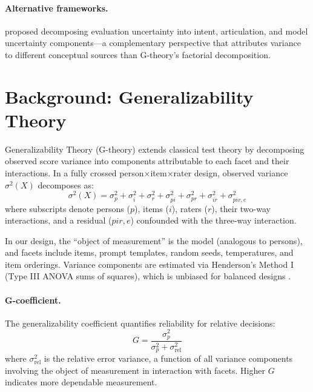 \documentclass[11pt]{article}
\begin{document}
\paragraph{Alternative frameworks.}
\citet{kunievsky2025} proposed decomposing evaluation uncertainty into intent, articulation, and model uncertainty components---a complementary perspective that attributes variance to different conceptual sources than G-theory's factorial decomposition.

\section{Background: Generalizability Theory}
\label{sec:background}

Generalizability Theory (G-theory) \citep{shavelson1991,brennan2001} extends classical test theory by decomposing observed score variance into components attributable to each facet and their interactions.
In a fully crossed person$\times$item$\times$rater design, observed variance $\sigma^2(X)$ decomposes as:
\begin{equation}
  \sigma^2(X) = \sigma^2_p + \sigma^2_i + \sigma^2_r + \sigma^2_{pi} + \sigma^2_{pr} + \sigma^2_{ir} + \sigma^2_{pir,e}
  \label{eq:gtheory}
\end{equation}
where subscripts denote persons ($p$), items ($i$), raters ($r$), their two-way interactions, and a residual ($pir,e$) confounded with the three-way interaction.

In our design, the ``object of measurement'' is the model (analogous to persons), and facets include items, prompt templates, random seeds, temperatures, and item orderings.
Variance components are estimated via Henderson's Method I (Type III ANOVA sums of squares), which is unbiased for balanced designs \citep{brennan2001}.

\paragraph{G-coefficient.}
The generalizability coefficient quantifies reliability for relative decisions:
\begin{equation}
  G = \frac{\sigma^2_p}{\sigma^2_p + \sigma^2_{\text{rel}}}
\end{equation}
where $\sigma^2_{\text{rel}}$ is the relative error variance, a function of all variance components involving the object of measurement in interaction with facets.
Higher $G$ indicates more dependable measurement.
\end{document}
